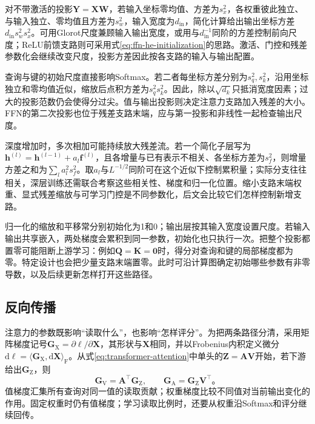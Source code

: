 对不带激活的投影$\bm Y=\bm X\bm W$，若输入坐标零均值、方差为$s_x^2$，各权重彼此独立、与输入独立、零均值且方差为$s_w^2$，输入宽度为$d_{\mathrm{in}}$，简化计算给出输出坐标方差$d_{\mathrm{in}}s_w^2s_x^2$。可用Glorot尺度兼顾输入输出宽度，或用与$d_{\mathrm{in}}^{-1}$同阶的方差控制前向尺度；ReLU前馈支路则可采用式\eqref{eq:ffn-he-initialization}的思路。激活、门控和残差参数化会继续改变尺度，投影方差因此按各支路的输入与输出配置。

查询与键的初始尺度直接影响Softmax。若二者每坐标方差分别为$s_q^2,s_k^2$，沿用坐标独立和零均值近似，缩放后点积方差为$s_q^2s_k^2$。因此，除以$\sqrt{d_k}$只抵消宽度因素；过大的投影范数仍会使得分过尖。值与输出投影则决定注意力支路加入残差的大小。FFN的第二次投影也位于残差支路末端，应与第一投影和非线性一起检查输出尺度。

深度增加时，多次相加可能持续放大残差流。若一个简化子层写为$\bm h^{(l)}=\bm h^{(l-1)}+a_l\bm f^{(l)}$，且各增量与已有表示不相关、各坐标方差为$s_f^2$，则增量方差之和为$\sum_l a_l^2s_f^2$。取$a_l$与$L^{-1/2}$同阶可在这个近似下控制累积量；实际分支往往相关，深层训练还需联合考察这些相关性、梯度和归一化位置。缩小支路末端权重、显式残差缩放与可学习门控是不同参数化，后文会比较它们怎样控制新增支路。

归一化的缩放和平移常分别初始化为1和0；输出层按其输入宽度设置尺度。若输入输出共享嵌入，两处梯度会累积到同一参数，初始化也只执行一次。把整个投影都置零可能阻断上游学习：例如$\bm Q=\bm K=\bm0$时，得分对查询和键的局部梯度都为零。特定设计也会把少量支路末端置零。此时可沿计算图确定初始哪些参数有非零导数，以及后续更新怎样打开这些路径。

\subsection{反向传播}
\label{sec:transformer-backpropagation}

注意力的参数既影响“读取什么”，也影响“怎样评分”。为把两条路径分清，采用矩阵梯度记号$\bm G_{\mathrm X}=\partial\ell/\partial\bm X$，其形状与$\bm X$相同，并以Frobenius内积定义微分$\mathrm d\ell=\langle\bm G_{\mathrm X},\mathrm d\bm X\rangle_{\mathrm F}$。从式\eqref{eq:transformer-attention}中单头的$\bm Z=\bm A\bm V$开始，若下游给出$\bm G_{\mathrm Z}$，则
\begin{equation}
  \bm G_{\mathrm V}=\bm A^{\top}\bm G_{\mathrm Z},\qquad
  \bm G_{\mathrm A}=\bm G_{\mathrm Z}\bm V^{\top}\text{。}
  \label{eq:transformer-aggregation-gradient}
\end{equation}
值梯度汇集所有查询对同一值的读取贡献；权重梯度比较不同值对当前输出变化的作用。固定权重时仍有值梯度；学习读取比例时，还要从权重沿Softmax和评分继续回传。

